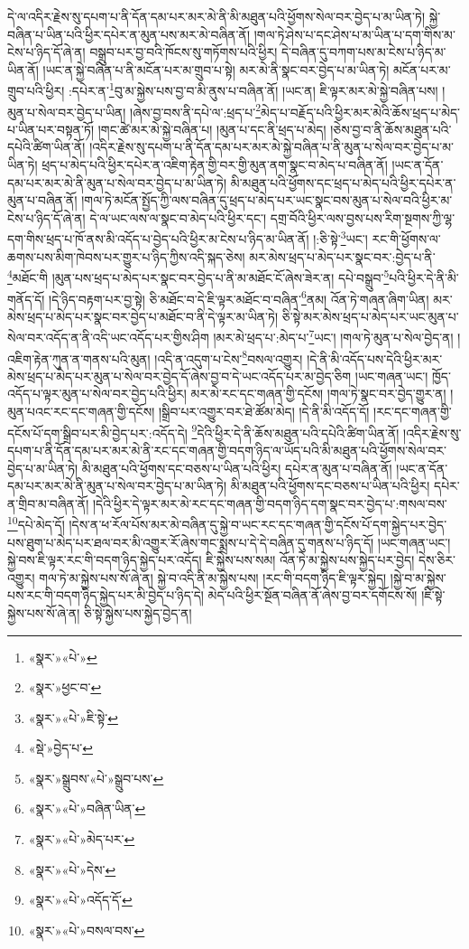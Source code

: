 དེ་ལ་འདིར་རྗེས་སུ་དཔག་པ་ནི་དོན་དམ་པར་མར་མེ་ནི་མི་མཐུན་པའི་ཕྱོགས་སེལ་བར་བྱེད་པ་མ་ཡིན་ཏེ། སྐྱེ་བཞིན་པ་ཡིན་པའི་ཕྱིར་དཔེར་ན་མུན་པས་མར་མེ་བཞིན་ནོ། །གལ་ཏེ་ཤེས་པ་དང་ཤེས་པ་མ་ཡིན་པ་དག་གིས་མ་ངེས་པ་ཉིད་དོ་ཞེ་ན། བསྒྲུབ་པར་བྱ་བའི་ཁོངས་སུ་གཏོགས་པའི་ཕྱིར། དེ་བཞིན་དུ་བཀག་པས་མ་ངེས་པ་ཉིད་མ་ཡིན་ནོ། །ཡང་ན་སྐྱེ་བཞིན་པ་ནི་མངོན་པར་མ་གྲུབ་པ་སྟེ། མར་མེ་ནི་སྣང་བར་བྱེད་པ་མ་ཡིན་ཏེ། མངོན་པར་མ་གྲུབ་པའི་ཕྱིར། :དཔེར་ན་\footnote{«སྣར་»«པེ་»}བུ་མ་སྐྱེས་པས་བྱ་བ་མི་ནུས་པ་བཞིན་ནོ། །ཡང་ན། ཇི་ལྟར་མར་མེ་སྐྱེ་བཞིན་པས། །མུན་པ་སེལ་བར་བྱེད་པ་ཡིན། །ཞེས་བྱ་བས་ནི་དཔེ་ལ་:ཕྲད་པ་\footnote{«སྣར་»ཕྱང་བ་}མེད་པ་བརྗོད་པའི་ཕྱིར་མར་མེའི་ཆོས་ཕྲད་པ་མེད་པ་ཡིན་པར་བསྟན་ཏོ། །གང་ཚེ་མར་མེ་སྐྱེ་བཞིན་པ། །མུན་པ་དང་ནི་ཕྲད་པ་མེད། །ཅེས་བྱ་བ་ནི་ཆོས་མཐུན་པའི་དཔེའི་ཚིག་ཡིན་ནོ། །འདིར་རྗེས་སུ་དཔག་པ་ནི་དོན་དམ་པར་མར་མེ་སྐྱེ་བཞིན་པ་ནི་མུན་པ་སེལ་བར་བྱེད་པ་མ་ཡིན་ཏེ། ཕྲད་པ་མེད་པའི་ཕྱིར་དཔེར་ན་འཇིག་རྟེན་གྱི་བར་གྱི་མུན་ནག་སྣང་བ་མེད་པ་བཞིན་ནོ། །ཡང་ན་དོན་དམ་པར་མར་མེ་ནི་མུན་པ་སེལ་བར་བྱེད་པ་མ་ཡིན་ཏེ། མི་མཐུན་པའི་ཕྱོགས་དང་ཕྲད་པ་མེད་པའི་ཕྱིར་དཔེར་ན་མུན་པ་བཞིན་ནོ། །གལ་ཏེ་མངོན་སྤྱོད་ཀྱི་ལས་བཞིན་དུ་ཕྲད་པ་མེད་པར་ཡང་སྣང་བས་མུན་པ་སེལ་བའི་ཕྱིར་མ་ངེས་པ་ཉིད་དོ་ཞེ་ན། དེ་ལ་ཡང་ལས་ལ་སྣང་བ་མེད་པའི་ཕྱིར་དང་། དགྲ་བོའི་ཕྱིར་ལས་བྱས་པས་རིག་སྔགས་ཀྱི་ལྷ་དག་གིས་ཕྲད་པ་ཁོ་ནས་མི་འདོད་པ་བྱེད་པའི་ཕྱིར་མ་ངེས་པ་ཉིད་མ་ཡིན་ནོ། །:ཅི་སྟེ་\footnote{«སྣར་»«པེ་»ཇི་སྟེ་}ཡང་། རང་གི་ཕྱོགས་ལ་ཆགས་པས་མིག་ཁེབས་པར་གྱུར་པ་ཉིད་ཀྱིས་འདི་སྐད་ཅེས། མར་མེས་ཕྲད་པ་མེད་པར་སྣང་བར་:བྱེད་པ་ནི་\footnote{«སྡེ་»བྱེད་པ་}མཐོང་གི །མུན་པས་ཕྲད་པ་མེད་པར་སྣང་བར་བྱེད་པ་ནི་མ་མཐོང་ངོ་ཞེས་ཟེར་ན། དཔེ་བསྒྲུབ་\footnote{«སྣར་»སྒྲུབས་«པེ་»སྒྲུབ་པས་}པའི་ཕྱིར་དེ་ནི་མི་གནོད་དོ། །དེ་ཉིད་བརྟག་པར་བྱ་སྟེ། ཅི་མཐོང་བ་དེ་ཇི་ལྟར་མཐོང་བ་བཞིན་\footnote{«སྣར་»«པེ་»བཞིན་ཡིན་}ནམ། འོན་ཏེ་གཞན་ཞིག་ཡིན། མར་མེས་ཕྲད་པ་མེད་པར་སྣང་བར་བྱེད་པ་མཐོང་བ་ནི་དེ་ལྟར་མ་ཡིན་ཏེ། ཅི་སྟེ་མར་མེས་ཕྲད་པ་མེད་པར་ཡང་མུན་པ་སེལ་བར་འདོད་ན་ནི་འདི་ཡང་འདོད་པར་གྱིས་ཤིག །མར་མེ་ཕྲད་པ་:མེད་པ་\footnote{«སྣར་»«པེ་»མེད་པར་}ཡང་། །གལ་ཏེ་མུན་པ་སེལ་བྱེད་ན། །འཇིག་རྟེན་ཀུན་ན་གནས་པའི་མུན། །འདི་ན་འདུག་པ་ངེས་\footnote{«སྣར་»«པེ་»དེས་}བསལ་འགྱུར། །དེ་ནི་མི་འདོད་པས་དེའི་ཕྱིར་མར་མེས་ཕྲད་པ་མེད་པར་མུན་པ་སེལ་བར་བྱེད་དོ་ཞེས་བྱ་བ་དེ་ཡང་འདོད་པར་མ་བྱེད་ཅིག །ཡང་གཞན་ཡང་། ཁྱོད་འདོད་པ་ལྟར་མུན་པ་སེལ་བར་བྱེད་པའི་ཕྱིར། མར་མེ་རང་དང་གཞན་གྱི་དངོས། །གལ་ཏེ་སྣང་བར་བྱེད་གྱུར་ན། །མུན་པའང་རང་དང་གཞན་གྱི་དངོས། །སྒྲིབ་པར་འགྱུར་བར་ཐེ་ཚོམ་མེད། །དེ་ནི་མི་འདོད་དོ། །རང་དང་གཞན་གྱི་དངོས་པོ་དག་སྒྲིབ་པར་མི་བྱེད་པར་:འདོད་དེ། \footnote{«སྣར་»«པེ་»འདོད་དོ་}དེའི་ཕྱིར་དེ་ནི་ཆོས་མཐུན་པའི་དཔེའི་ཚིག་ཡིན་ནོ། །འདིར་རྗེས་སུ་དཔག་པ་ནི་དོན་དམ་པར་མར་མེ་ནི་རང་དང་གཞན་གྱི་བདག་ཉིད་ལ་ཡོད་པའི་མི་མཐུན་པའི་ཕྱོགས་སེལ་བར་བྱེད་པ་མ་ཡིན་ཏེ། མི་མཐུན་པའི་ཕྱོགས་དང་བཅས་པ་ཡིན་པའི་ཕྱིར། དཔེར་ན་མུན་པ་བཞིན་ནོ། །ཡང་ན་དོན་དམ་པར་མར་མེ་ནི་མུན་པ་སེལ་བར་བྱེད་པ་མ་ཡིན་ཏེ། མི་མཐུན་པའི་ཕྱོགས་དང་བཅས་པ་ཡིན་པའི་ཕྱིར། དཔེར་ན་གྲིབ་མ་བཞིན་ནོ། །དེའི་ཕྱིར་དེ་ལྟར་མར་མེ་རང་དང་གཞན་གྱི་བདག་ཉིད་དག་སྣང་བར་བྱེད་པ་:གསལ་བས་\footnote{«སྣར་»«པེ་»བསལ་བས་}དཔེ་མེད་དོ། །དེས་ན་ཕ་རོལ་པོས་མར་མེ་བཞིན་དུ་སྐྱེ་བ་ཡང་རང་དང་གཞན་གྱི་དངོས་པོ་དག་སྐྱེད་པར་བྱེད་པས་ཐུག་པ་མེད་པར་ཐལ་བར་མི་འགྱུར་རོ་ཞེས་གང་སྨྲས་པ་དེ་དེ་བཞིན་དུ་གནས་པ་ཉིད་དོ། །ཡང་གཞན་ཡང་། སྐྱེ་བས་ཇི་ལྟར་རང་གི་བདག་ཉིད་སྐྱེད་པར་འདོད། ཇི་སྐྱེས་པས་སམ། འོན་ཏེ་མ་སྐྱེས་པས་སྐྱེད་པར་བྱེད། དེས་ཅིར་འགྱུར། གལ་ཏེ་མ་སྐྱེས་པས་སོ་ཞེ་ན། སྐྱེ་བ་འདི་ནི་མ་སྐྱེས་པས། །རང་གི་བདག་ཉིད་ཇི་ལྟར་སྐྱེད། །སྐྱེ་བ་མ་སྐྱེས་པས་རང་གི་བདག་ཉིད་སྐྱེད་པར་མི་བྱེད་པ་ཉིད་དེ། མེད་པའི་ཕྱིར་སྔོན་བཞིན་ནོ་ཞེས་བྱ་བར་དགོངས་སོ། །ཇི་སྟེ་སྐྱེས་པས་སོ་ཞེ་ན། ཅི་སྟེ་སྐྱེས་པས་སྐྱེད་བྱེད་ན། 